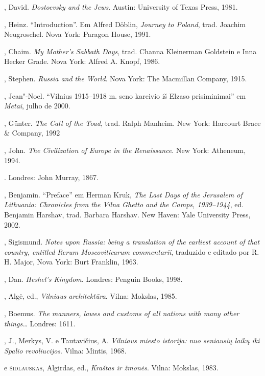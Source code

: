 \begin{bibliohedra}
  , David. \textit{Dostoevsky and the Jews}. Austin: University
  of Texas Press, 1981.

  , Heinz. ``Introduction''. Em Alfred Döblin, \textit{Journey to
  Poland}, trad. Joachim Neugroschel. Nova York: Paragon House, 1991.

  , Chaim. \textit{My Mother's Sabbath Days}, trad. Channa Kleinerman
  Goldstein e Inna Hecker Grade. Nova York: Alfred A. Knopf, 1986.

  , Stephen. \textit{Russia and the World}. Nova York: The Macmillan
  Company, 1915.

  , Jean"-Noel. ``Vilnius 1915--1918 m. seno kareivio iš Elzaso
  prisiminimai'' em \textit{Metai}, julho de 2000.

  , Günter. \textit{The Call of the Toad}, trad. Ralph Manheim. New
  York: Harcourt Brace \& Company, 1992

  , John. \textit{The Civilization of Europe in the Renaissance}. New
  York: Atheneum, 1994.

  . Londres:
  John Murray, 1867.

  , Benjamin. ``Preface'' em Herman Kruk, \textit{The Last Days of
  the Jerusalem of Lithuania: Chronicles from the Vilna Ghetto and the
  Camps, 1939--1944}, ed. Benjamin Harshav, trad. Barbara Harshav. New
  Haven: Yale University Press, 2002.

  , Sigismund. \textit{Notes upon Russia: being a translation
  of the earliest account of that country, entitled Rerum Moscoviticarum
  commentarii}, traduzido e editado por R.\,H. Major, Nova York: Burt
  Franklin, 1963.

  , Dan. \textit{Heshel's Kingdom}. Londres: Penguin Books, 1998.

  , Algė, ed., \textit{Vilniaus architektūra}. Vilna:
  Mokslas, 1985.

  , Boemus. \textit{The manners, lawes and customs of all nations
  with many other things\ldots{}} Londres: 1611.

  , J., Merkys, V. e Tautavičius, A. \textit{Vilniaus miesto
  istorija: nuo seniausių laikų iki Spalio revoliucijos}. Vilna:
  Mintis, 1968.

  \titidem e \textsc{šidlauskas}, Algirdas, ed., \textit{Kraštas ir
  žmonės}. Vilna: Mokslas, 1983.


\end{bibliohedra}
